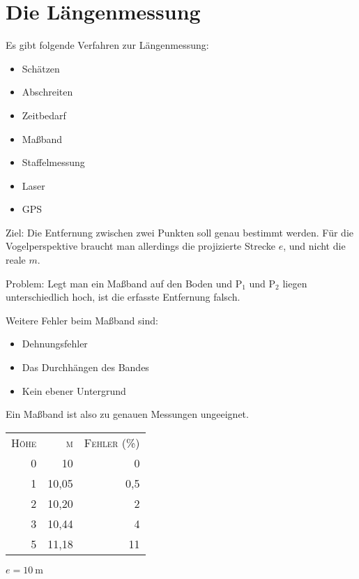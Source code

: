 \section{Die Längenmessung}
\begin{list}{}{}
	\item[Es gibt folgende Verfahren zur Längenmessung:]~
	\begin{itemize}
		\item Schätzen
		\item Abschreiten
		\item Zeitbedarf
		\item Maßband
		\item Staffelmessung
		\item Laser
		\item GPS
	\end{itemize}
	\item[Ziel:] Die Entfernung zwischen zwei Punkten soll genau bestimmt werden.
		Für die Vogelperspektive braucht man allerdings die projizierte Strecke $e$,
		und nicht die reale $m$.
\end{list}

\begin{list}{}{}
	\item[Problem:] Legt man ein Maßband auf den Boden und P$_1$ und P$_2$ liegen unterschiedlich
		hoch, ist die erfasste Entfernung falsch.
	\item[Weitere Fehler beim Maßband sind:]~
	\begin{itemize}
		\item Dehnungsfehler
		\item Das Durchhängen des Bandes
		\item Kein ebener Untergrund
	\end{itemize}
\end{list}
Ein Maßband ist also zu genauen Messungen ungeeignet.

\vspace{0.5cm}
\ZifferPunktAus
\begin{tabular}{d{0}d{2}d{1}}
	\textsc{Höhe} & \textsc{m} & \textsc{Fehler (\%)} \\
	0 & 10		& 0 \\
	1 & 10,05	& 0,5 \\
	2 & 10,20	& 2 \\
	3 & 10,44	& 4 \\
	5 & 11,18	& 11 \\
\end{tabular}\ZifferPunktAn
$e=\SI{10}{\metre}$
\vspace{0.3cm}

